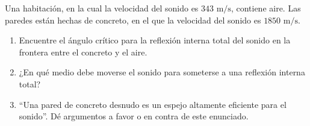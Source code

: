 \item Una habitación, en la cual la velocidad del sonido es $343\text{ m/s}$, contiene aire. Las paredes están hechas de concreto, en el que la velocidad del sonido es $1850\text{ m/s}$.
\begin{enumerate}
    \item Encuentre el ángulo crítico para la reflexión interna total del sonido en la frontera entre el concreto y el aire.
    \item ¿En qué medio debe moverse el sonido para someterse a una reflexión interna total?
    \item ``Una pared de concreto desnudo es un espejo altamente eficiente para el sonido''. Dé argumentos a favor o en contra de este enunciado.
\end{enumerate}
